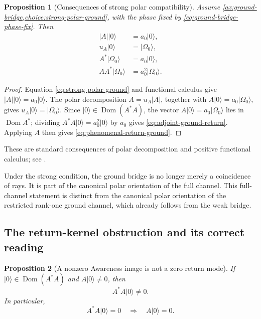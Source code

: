 \documentclass[11pt,reqno]{scrartcl}
\newcommand{\ket}[1]{\lvert #1\rangle}
\DeclareMathOperator{\Dom}{Dom}
\theoremstyle{plain}
\newtheorem{proposition}[proposition]{Proposition}
\theoremstyle{definition}
\theoremstyle{remark}
\begin{document}
\begin{proposition}[Consequences of strong polar compatibility]
\label{prop:strong-polar-consequences}
Assume \cref{ax:ground-bridge,choice:strong-polar-ground}, with the phase
fixed by \eqref{eq:ground-bridge-phase-fix}.  Then
\begin{align}
  |A|\ket0
  &=a_0\ket0,
  \label{eq:absolute-A-ground}\\
  u_A\ket0
  &=\ket{\Omega_0},
  \label{eq:polar-ground-map}\\
  A^*\ket{\Omega_0}
  &=a_0\ket0,
  \label{eq:adjoint-ground-return}\\
  AA^*\ket{\Omega_0}
  &=a_0^2\ket{\Omega_0}.
  \label{eq:phenomenal-return-ground}
\end{align}
\end{proposition}

\begin{proof}
Equation \eqref{eq:strong-polar-ground} and functional calculus give
$|A|\ket0=a_0\ket0$.  The polar decomposition
$A=u_A|A|$, together with $A\ket0=a_0\ket{\Omega_0}$, gives
$u_A\ket0=\ket{\Omega_0}$.  Since
$\ket0\in\Dom(A^*A)$, the vector $A\ket0=a_0\ket{\Omega_0}$ lies in
$\Dom A^*$; dividing
$A^*A\ket0=a_0^2\ket0$ by $a_0$ gives
\eqref{eq:adjoint-ground-return}.  Applying $A$ then gives
\eqref{eq:phenomenal-return-ground}.
\end{proof}

These are standard consequences of polar decomposition and positive
functional calculus; see \cite{Kato,ReedSimon}.

Under the strong condition, the ground bridge is no longer merely a
coincidence of rays.  It is part of the canonical polar orientation of the
full channel.  This full-channel statement is distinct from the canonical
polar orientation of the restricted rank-one ground channel, which already
follows from the weak bridge.

\subsection{The return-kernel obstruction and its correct reading}

\begin{proposition}[A nonzero Awareness image is not a zero return mode]
\label{prop:vacuum-not-return-zero-mode}
If $\ket0\in\Dom(A^*A)$ and $A\ket0\neq0$, then
\begin{equation}
  A^*A\ket0\neq0.
\end{equation}
In particular,
\begin{equation}
  A^*A\ket0=0
  \quad\Longrightarrow\quad
  A\ket0=0.
  \label{eq:return-kernel-obstruction}
\end{equation}
\end{proposition}
\end{document}
